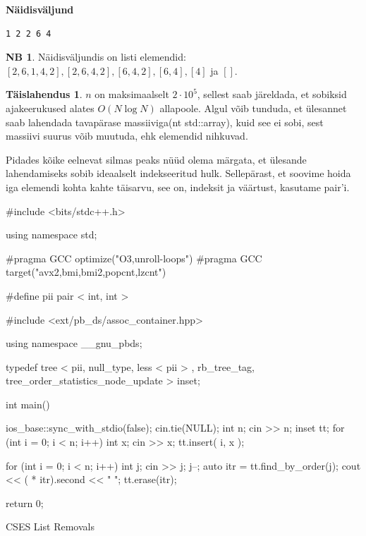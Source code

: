 \documentclass{trkut}
\theoremstyle{definition}
\newtheorem*{extra}{NB}
\newtheorem*{solution}{Täislahendus}
\begin{document}
\textbf{Näidisväljund}

\begin{verbatim}
1 2 2 6 4
\end{verbatim}
\begin{extra}
Näidisväljundis on listi elemendid: $[2,6,1,4,2], [2,6,4,2], [6,4,2], [6,4], [4]$
 ja $[]$.
\end{extra}

\begin{solution}
$n$ on maksimaalselt $2\cdot 10^5$, sellest saab järeldada, et sobiksid ajakeerukused alates $O(N\log N)$ allapoole.
Algul võib tunduda, et ülesannet saab lahendada tavapärase massiiviga(nt std::array), kuid see ei sobi, sest massiivi suurus võib muutuda, ehk elemendid nihkuvad.

Pidades kõike eelnevat silmas peaks nüüd olema märgata, et ülesande lahendamiseks sobib ideaalselt indekseeritud hulk.
Sellepärast, et soovime hoida iga elemendi kohta kahte täisarvu, see on, indeksit ja väärtust, kasutame pair'i.
\end{solution}
\begin{cclol}    
#include <bits/stdc++.h>

using namespace std;

#pragma GCC optimize("O3,unroll-loops")
#pragma GCC target("avx2,bmi,bmi2,popcnt,lzcnt")

#define pii pair < int, int >

  #include <ext/pb_ds/assoc_container.hpp>

  using namespace __gnu_pbds;

typedef tree < pii, null_type, less < pii > , rb_tree_tag, 
tree_order_statistics_node_update > inset;

int main() {
  ios_base::sync_with_stdio(false);
  cin.tie(NULL);
  int n;
  cin >> n;
  inset tt;
  for (int i = 0; i < n; i++) {
    int x;
    cin >> x;
    tt.insert({
      i,
      x
    });
  }

  for (int i = 0; i < n; i++) {
    int j;
    cin >> j;
    j--;
    auto itr = tt.find_by_order(j);
    cout << ( * itr).second << " ";
    tt.erase(itr);
  }

  return 0;
}
    \end{cclol}
    \begin{kk}[H]
    \caption{CSES List Removals}%
    \end{kk}
\end{document}
